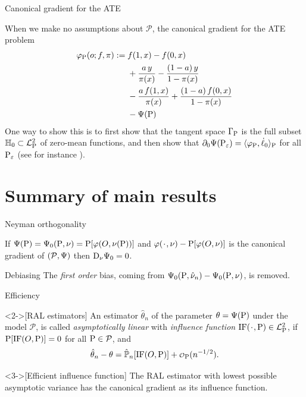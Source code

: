 \documentclass{beamer}\usepackage{listings}
\begin{document}
\begin{frame}[label={sec:org8458e25}]{Canonical gradient for the ATE}
\begin{example}[ATE]
When we make no assumptions about \(\mathcal{P}\), the canonical gradient for the ATE problem
\begin{align*}
  \phi_{\P}(o; f, \pi) := \;& f(1,x) - f(0,x) \\
                             & +  \frac{a\,y}{\pi(x)} - \frac{(1-a)\,y}{1-\pi(x)} \\
                             &  - \frac{a\,f(1,x)}{\pi(x)} +
                               \frac{(1-a)\,f(0,x)}{1-\pi(x)} \\
                             &  - \TT(\P)
\end{align*}
\pause One way to show this is to first show that the tangent space $\Gamma_{\P}$ is the full subset
$\mathbb{H}_0 \subset \lp$ of zero-mean functions, and then show that
$ \partial_0{\TT(\P_{\epsilon})} = \langle \phi_{\P}, \dot{\ell}_0 \rangle_{\P}$ for all
$\P_{\epsilon}$ (see for instance \cite{kennedy2016semiparametric}).
\end{example}
\end{frame}

\section{Summary of main results}
\label{sec:orga134414}
\begin{frame}[label={sec:org79e42e8}]{Neyman orthogonality}
\begin{theorem}
If $\TT(\P) = \TT_0(\P, \nu) = \P[\phi(O, \nu(\P))]$ and $\phi(\blank, \nu) - \P[\phi(O, \nu)]$ is the
canonical gradient of $(\mathcal{P}, \TT)$ then $\mathrm{D_{\nu}{\TT_0}} = 0$.

\hfill \pause
\end{theorem}

\begin{block}{Debiasing}
The \emph{first order} bias, coming from \(\TT_0(\P, \hat{\nu}_n) - \TT_0(\P, \nu)\), is removed. 
\end{block}
\end{frame}

\begin{frame}[label={sec:org4c20bd3}]{Efficiency}
\begin{definition}<2->[RAL estimators]
An estimator $\hat{\theta}_n$ of the parameter $\theta = \TT(\P)$ under the model $\mathcal{P}$, is
called \textit{asymptotically linear} with \textit{influence function} $\ic(\blank, \P) \in \lp$, if 
$\P[\ic(O, \P)] = 0$ for all $\P \in \mathcal{P}$, and 
\begin{equation*}
  \hat{\theta}_n - \theta = \empmeas[\ic(O, \P)] + \smallO_{\P}(n^{-1/2}).
\end{equation*}
\end{definition}

\begin{theorem}<3->[Efficient influence function]
The RAL estimator with lowest possible asymptotic variance has the canonical gradient as its
influence function.
\end{theorem}
\end{frame}
\end{document}
